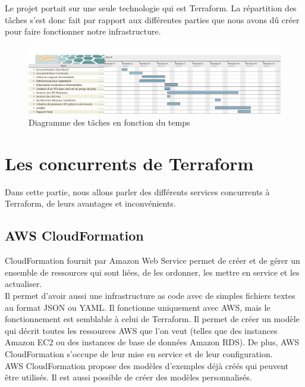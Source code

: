 \documentclass[]{article}
\begin{document}
Le projet portait sur une seule technologie qui est Terraform. La
répartition des tâches s'est donc fait par rapport aux différentes
parties que nous avons dû créer pour faire fonctionner notre
infrastructure.
\begin{figure}
\centering
\includegraphics{Images/TerraFormGant.png}
\caption{Diagramme des tâches en fonction du temps}
\end{figure}
\newpage
\section{Les concurrents de Terraform}\label{avant-terraform}
Dans cette partie, nous allons parler des différents services concurrents à Terraform, de leurs avantages et inconvénients.
\subsection{AWS CloudFormation}\label{aws-cloudformation}
CloudFormation fournit par Amazon Web Service permet de créer et de
gérer un ensemble de ressources qui sont liées, de les ordonner, les
mettre en service et les actualiser. \\
Il permet d'avoir aussi une infrastructure as code avec de simples fichiers textes au
format JSON ou YAML. Il fonctionne uniquement avec AWS, mais le
fonctionnement est semblable à celui de  Terraform. Il permet de créer un modèle qui
décrit toutes les ressources AWS que l'on veut (telles que des instances
Amazon EC2 ou des instances de base de données Amazon RDS). De plus, AWS
CloudFormation s'occupe de leur mise en service et de leur
configuration.\\
AWS CloudFormation propose des modèles d'exemples déjà
créés qui peuvent être utilisés. Il est aussi possible de créer des
modèles personnalisés.
\end{document}

